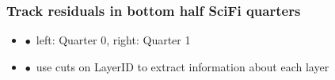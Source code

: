 \documentclass[aspectratio=1610, 12pt]{beamer}
\begin{document}
\begin{frame}\frametitle{Track residuals in bottom half SciFi quarters}
  \begin{itemize}
    \item $\bullet$\, left: Quarter 0, right: Quarter 1
    \item $\bullet$\, use cuts on LayerID to extract information about each layer
  \end{itemize}
  \begin{figure}
  \end{figure}
\end{frame}
\end{document}
